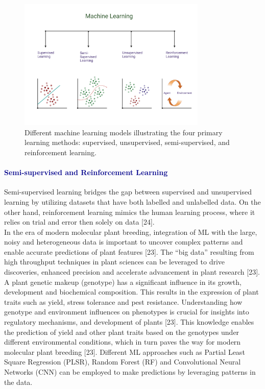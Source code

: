\documentclass[12pt,a4paper]{report}
\begin{document}
\begin{figure}[h]
    \centering
    \includegraphics[width=0.8\textwidth]{Figures/ml.png} 
    \caption{Different machine learning models illustrating the four primary learning methods: supervised, unsupervised, semi-supervised, and reinforcement learning.}
    \label{fig:ml}
\end{figure}

\paragraph{\textcolor{darkblue}{Semi-supervised and Reinforcement Learning}}
Semi-supervised learning bridges the gap between supervised and unsupervised learning by utilizing datasets that have both labelled and unlabelled data. On the other hand, reinforcement learning mimics the human learning process, where it relies on trial and error then solely on data [24]. \\

In the era of modern molecular plant breeding, integration of ML with the large, noisy and heterogeneous data is important to uncover complex patterns and enable accurate predictions of plant features [23]. The “big data” resulting from high throughput techniques in plant sciences can be leveraged 
to drive discoveries, enhanced precision and accelerate advancement in plant research [23]. A plant genetic makeup (genotype) has a significant influence in its growth, development and biochemical composition. This results in the expression of plant traits such as yield, stress tolerance and pest resistance. 
Understanding how genotype and environment influences on phenotypes is crucial for insights into regulatory mechanisms, and development of plants [23]. This knowledge enables the  prediction of yield and other plant traits based on the genotypes under different environmental conditions, which in turn paves the 
way for modern molecular plant breeding [23]. Different ML approaches such as Partial Least Square Regression (PLSR), Random Forest (RF) and Convolutional Neural Networks (CNN)  can be employed to make predictions by leveraging patterns in the data. \\
\end{document}
